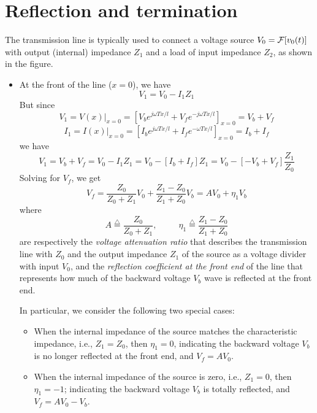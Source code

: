 \section*{Reflection and termination}

The transmission line is typically used to connect a voltage source 
$V_0={\cal F}[v_0(t)]$ with output (internal) impedance $Z_1$ and a load 
of input impedance $Z_2$, as shown in the figure. 


\begin{itemize}
\item At the front of the line ($x=0$), we have
  \[	V_1=V_0-I_1Z_1	\]
  But since
  \[ V_1=V(x)|_{x=0}=\left[V_be^{j\omega Tx/l}+V_fe^{-j\omega Tx/l}\right]_{x=0}=V_b+V_f \]
  \[ I_1=I(x)|_{x=0}=\left[I_be^{j\omega Tx/l}+I_fe^{-\omega Tx/l}\right]_{x=0}=I_b+I_f \]
  we have
  \[ V_1=V_b+V_f=V_0-I_1Z_1=V_0-[I_b+I_f]Z_1
  =V_0-[-V_b+V_f]\frac{Z_1}{Z_0}	\]
  Solving for $V_f$, we get
  \[V_f=\frac{Z_0}{Z_0+Z_1}V_0+\frac{Z_1-Z_0}{Z_1+Z_0}V_b
  =AV_0+\eta_1V_b	\]
  where
  \[	A\stackrel{\triangle}{=}\frac{Z_0}{Z_0+Z_1},\;\;\;\;\;\;\;\;\;
  \eta_1\stackrel{\triangle}{=}\frac{Z_1-Z_0}{Z_1+Z_0} \]
  are respectively the {\em voltage attenuation ratio} that describes the 
  transmission line with $Z_0$ and the output impedance $Z_1$ of the source 
  as a voltage divider with input $V_0$, and the {\em reflection coefficient 
    at the front end} of the line that represents how much of the backward 
  voltage $V_b$ wave is reflected at the front end. 

  In particular, we consider the following two special cases:
  \begin{itemize}
  \item When the internal impedance of the source matches the characteristic 
    impedance, i.e., $Z_1=Z_0$, then $\eta_1=0$, 
    indicating the backward voltage $V_b$ is no longer reflected at the front 
    end, and $V_f=A V_0$.
  \item When the internal impedance of the source is zero, i.e., $Z_1=0$,
    then $\eta_1=-1$; indicating the backward voltage $V_b$ is totally reflected,
    and $V_f=AV_0-V_b$.
  \end{itemize}


\end{itemize}
